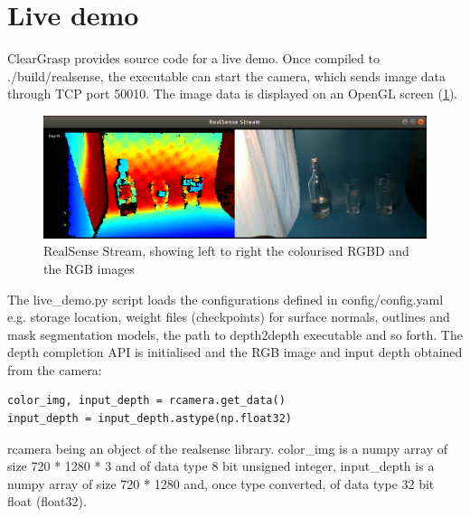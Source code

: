 \section{Live demo}
ClearGrasp provides source code for a live demo. Once compiled to ./build/realsense, the executable can start the camera, which sends image data through TCP port 50010. The image data is displayed on an OpenGL screen (\ref{fig:realsenseOutputForReport}).
\begin{figure}[h!]
\centering
\includegraphics[width=\textwidth]{Figures/realsenseOutputForReport.png}
\caption{RealSense Stream, showing left to right the colourised RGBD and the RGB images}
\label{fig:realsenseOutputForReport}
\end{figure}
The live\_demo.py script loads the configurations defined in config/config.yaml e.g. storage location, weight files (checkpoints) for surface normals, outlines and mask segmentation models, the path to depth2depth executable and so forth. The depth completion API is initialised and the RGB image and input depth obtained from the camera:
\begin{verbatim}
color_img, input_depth = rcamera.get_data()
input_depth = input_depth.astype(np.float32)
\end{verbatim}
rcamera being an object of the realsense library. color\_img is a numpy array of size 720 * 1280 * 3 and of data type 8 bit unsigned integer, input\_depth is a numpy array of size 720 * 1280 and, once type converted, of data type 32 bit float (float32).
